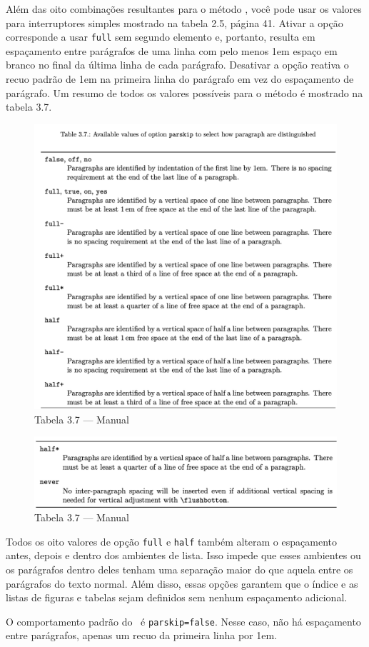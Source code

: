 Além das oito combinações resultantes para o método , você pode usar os valores para interruptores simples mostrado na tabela 2.5, página 41. Ativar a opção corresponde a usar \texttt{full} sem segundo elemento e, portanto, resulta em espaçamento entre parágrafos de uma linha com pelo menos 1em espaço em branco no final da última linha de cada parágrafo. Desativar a opção reativa o recuo padrão de 1em na primeira linha do parágrafo em vez do espaçamento de parágrafo. Um resumo de todos os valores possíveis para o método é mostrado na tabela 3.7.

\begin{figure}[h]
    \centering
    \includegraphics[width=0.9\linewidth]{tab3_7.png}
    \caption{Tabela 3.7 --- Manual}
    \label{fig:tab3_7}
\end{figure}

\begin{figure}[t!]
    \centering
    \includegraphics[width=0.8\linewidth]{tab3_7b.png}
    \caption{Tabela 3.7 --- Manual}
    \label{fig:tab3_7b}
\end{figure}

Todos os oito valores de opção \texttt{full} e \texttt{half} também alteram o espaçamento antes, depois e dentro dos ambientes de lista. Isso impede que esses ambientes ou os parágrafos dentro deles tenham uma separação maior do que aquela entre os parágrafos do texto normal. Além disso, essas opções garantem que o índice e as listas de figuras e tabelas sejam definidos sem nenhum espaçamento adicional.

O comportamento padrão do \KOMAScript\ é \texttt{parskip=false}. Nesse caso, não há espaçamento entre parágrafos, apenas um recuo da primeira linha por 1em.
